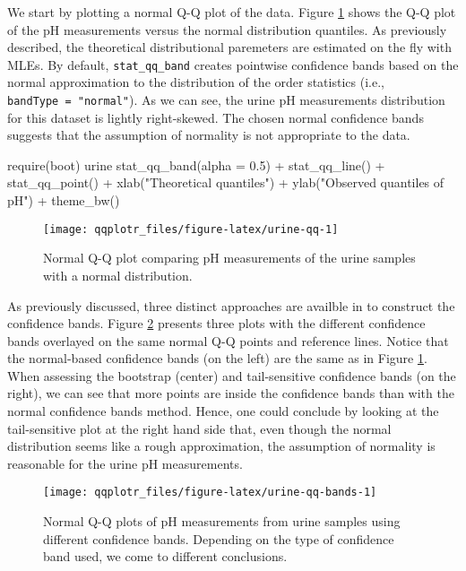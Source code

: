 We start by plotting a normal Q-Q plot of the data. Figure
\ref{fig:urine-qq} shows the Q-Q plot of the pH measurements versus the
normal distribution quantiles. As previously described, the theoretical
distributional paremeters are estimated on the fly with MLEs. By
default, \texttt{stat\_qq\_band} creates pointwise confidence bands
based on the normal approximation to the distribution of the order
statistics (i.e., \texttt{bandType\ =\ "normal"}). As we can see, the
urine pH measurements distribution for this dataset is lightly
right-skewed. The chosen normal confidence bands suggests that the
assumption of normality is not appropriate to the data.

\begin{Schunk}
\begin{Sinput}
require(boot)
urine %>% ggplot(aes(sample = ph)) + 
  stat_qq_band(alpha = 0.5) + 
  stat_qq_line() + 
  stat_qq_point() +
  xlab("Theoretical quantiles") +
  ylab("Observed quantiles of pH") +
  theme_bw()
\end{Sinput}
\begin{figure}

{\centering \texttt{[image: qqplotr\_files/figure-latex/urine-qq-1]} 

}

\caption{Normal Q-Q plot comparing pH measurements of the urine samples with a normal distribution. }\label{fig:urine-qq}
\end{figure}
\end{Schunk}

\FloatBarrier

As previously discussed, three distinct approaches are availble in
 to construct the confidence bands. Figure
\ref{fig:urine-qq-bands} presents three plots with the different
confidence bands overlayed on the same normal Q-Q points and reference
lines. Notice that the normal-based confidence bands (on the left) are
the same as in Figure \ref{fig:urine-qq}. When assessing the bootstrap
(center) and tail-sensitive confidence bands (on the right), we can see
that more points are inside the confidence bands than with the normal
confidence bands method. Hence, one could conclude by looking at the
tail-sensitive plot at the right hand side that, even though the normal
distribution seems like a rough approximation, the assumption of
normality is reasonable for the urine pH measurements.

\begin{Schunk}
\begin{figure}

{\centering \texttt{[image: qqplotr\_files/figure-latex/urine-qq-bands-1]} 

}

\caption[Normal Q-Q plots of pH measurements from urine samples using different confidence bands]{Normal Q-Q plots of pH measurements from urine samples using different confidence bands. Depending on the type of confidence band used, we come to different conclusions.}\label{fig:urine-qq-bands}
\end{figure}
\end{Schunk}

